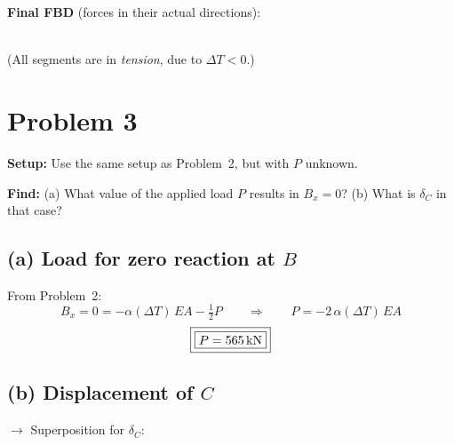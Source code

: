 \documentclass[11pt]{article}
\begin{document}
\noindent
\textbf{Final FBD} (forces in their actual directions):

\begin{center}
\\[0.3em]
(All segments are in \emph{tension}, due to $\Delta T < 0$.)
\end{center}

\section*{Problem 3}

\noindent
\textbf{Setup:} Use the same setup as Problem~2, but with $P$ unknown.

\smallskip
\noindent
\textbf{Find:} (a) What value of the applied load $P$ results in $B_x = 0$?
(b) What is $\delta_C$ in that case?

\subsection*{(a) Load for zero reaction at $B$}

\noindent
From Problem~2:
\[
  B_x = 0 = -\alpha(\Delta T)\,EA - \tfrac12 P
  \qquad\Rightarrow\qquad
  P = -2\,\alpha(\Delta T)\,EA
\]
\[
  \fbox{\fbox{$P = \SI{565}{kN}$}}
\]

\subsection*{(b) Displacement of $C$}

\noindent
$\rightarrow$ Superposition for $\delta_C$:
\end{document}
